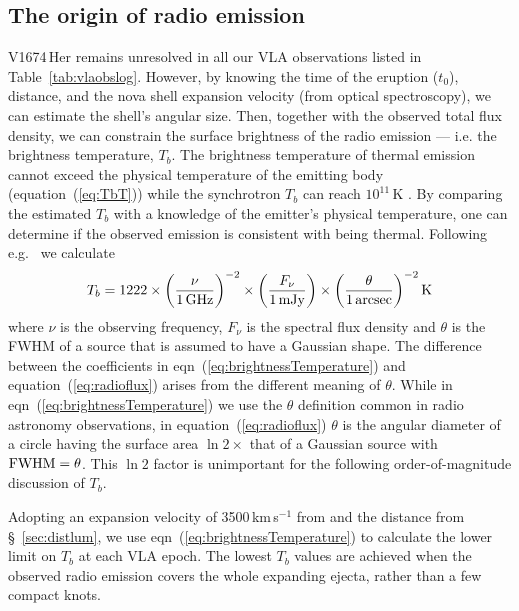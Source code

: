 \documentclass[a4paper,fleqn,usenatbib]{mnras}
\newcommand{\nova}{V1674\,Her}
\begin{document}
\subsection{The origin of radio emission}
\label{sec:radiodiscussion}

\nova{} remains unresolved in all our VLA observations listed in Table~\ref{tab:vlaobslog}. 
However, by knowing the time of the eruption ($t_0$), distance, and the nova shell expansion velocity 
(from optical spectroscopy), we can estimate the shell's angular size. Then, together 
with the observed total flux density, we can constrain the surface brightness of the 
radio emission --- i.e. the brightness temperature, $T_b$. 
The brightness temperature of thermal emission cannot exceed the physical temperature of
the emitting body (equation~(\ref{eq:TbT})) 
while the synchrotron $T_b$ can reach $10^{11}$\,K \citep{1969ApJ...155L..71K,1994ApJ...426...51R}. 
By comparing the estimated $T_b$ with a knowledge of the emitter's physical temperature, 
one can determine if the observed emission is consistent with being thermal. 
Following e.g.~\cite{2021MNRAS.501.1394N}
we calculate 
\begin{equation}
 T_b = 1222 \times \bigg(\frac{\nu}{\rm 1\,GHz}\bigg)^{-2} \times \bigg(\frac{F_\nu}{\rm 1\,mJy}\bigg) \times \bigg(\frac{\theta}{\rm 1\,arcsec}\bigg)^{-2}\,{\rm K}
 \label{eq:brightnessTemperature}
\end{equation}
where $\nu$ is the observing frequency, $F_\nu$ is the spectral flux density
and $\theta$ is the FWHM of a source that is assumed to have a Gaussian shape. 
The difference between the coefficients in eqn~(\ref{eq:brightnessTemperature}) and equation~(\ref{eq:radioflux})
arises from the different meaning of $\theta$. 
While in eqn~(\ref{eq:brightnessTemperature}) 
we use the $\theta$ definition common in radio astronomy observations,
in equation~(\ref{eq:radioflux}) $\theta$ is the angular diameter of a circle
%
having the surface area $\ln 2 \times$ that of a Gaussian source with ${\rm FWHM} = \theta$.
%
This $\ln 2$ factor is unimportant for the following order-of-magnitude discussion of $T_b$.

Adopting an expansion velocity of 3500\,km\,s$^{-1}$ from \cite{2021ATel14710....1A}
and the distance from \S~\ref{sec:distlum}, 
we use eqn~(\ref{eq:brightnessTemperature}) to calculate the lower limit on $T_b$ at each VLA epoch. The lowest $T_b$ values are achieved when the observed radio emission covers the whole expanding ejecta, rather than a few compact knots.
\end{document}
